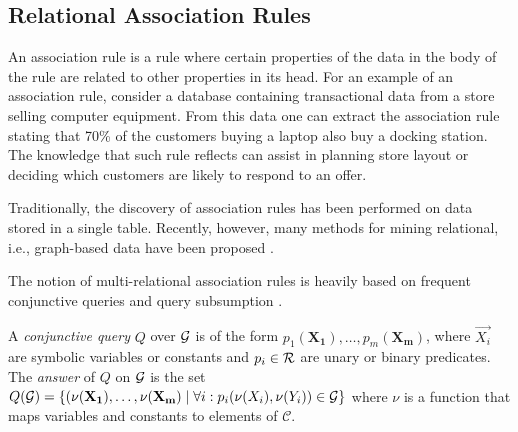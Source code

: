 

\subsection{Relational Association Rules}
\label{subsec:assoc_rule}
An association rule is a rule where certain properties of the data in the body of
the rule are related to other properties in its head. For an example of an association rule, consider a
database containing transactional data from a store selling computer equipment.
From this data one can extract the association rule stating that 70\% of the customers
buying a laptop also buy a docking station. The knowledge that such rule reflects 
can assist in planning store layout or deciding which customers are likely to respond to an
offer.

Traditionally, the discovery of association rules  has been performed on data stored in a single table.
Recently, however, many methods for mining relational, i.e., graph-based data have been
proposed \cite{DBLP:books/daglib/0021868}.

The notion of multi-relational association rules is heavily based on frequent conjunctive queries and query subsumption \cite{warmer}. 

\begin{definition}
A \emph{conjunctive query} $Q$ over $\mathcal{G}$ is of the form $p_1(\mathbf{X_1}),\dotsc,p_m(\mathbf{X_m})$, where $\vec{X_i}$ are symbolic variables or constants and $p_i \in \mathcal{R}$ are unary or binary predicates. The \emph{answer} of $Q$ on $\mathcal{G}$ is the set $Q(\mathcal{G}) = \{ (\nu(\mathbf{X_1}), \dotsc, \nu(\mathbf{X_m}) \mid \forall i: p_i(\nu(X_i), \nu(Y_i)) \in \mathcal{G} \}$ where $\nu$ is a function that maps variables and constants to elements of $\mathcal{C}$.
\end{definition}

